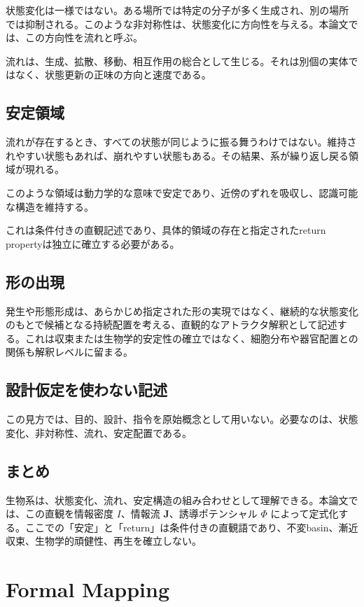 \documentclass[11pt]{ltjsarticle}
\newcommand{\I}{I}
\newcommand{\J}{\mathbf{J}}
\newcommand{\PhiI}{\Phi}
\begin{document}
状態変化は一様ではない。ある場所では特定の分子が多く生成され、別の場所では抑制される。このような非対称性は、状態変化に方向性を与える。本論文では、この方向性を流れと呼ぶ。

流れは、生成、拡散、移動、相互作用の総合として生じる。それは別個の実体ではなく、状態更新の正味の方向と速度である。

\subsection{安定領域}

流れが存在するとき、すべての状態が同じように振る舞うわけではない。維持されやすい状態もあれば、崩れやすい状態もある。その結果、系が繰り返し戻る領域が現れる。

このような領域は動力学的な意味で安定であり、近傍のずれを吸収し、認識可能な構造を維持する。

これは条件付きの直観記述であり、具体的領域の存在と指定されたreturn propertyは独立に確立する必要がある。

\subsection{形の出現}

発生や形態形成は、あらかじめ指定された形の実現ではなく、継続的な状態変化のもとで候補となる持続配置を考える、直観的なアトラクタ解釈として記述する。これは収束または生物学的安定性の確立ではなく、細胞分布や器官配置との関係も解釈レベルに留まる。

\subsection{設計仮定を使わない記述}

この見方では、目的、設計、指令を原始概念として用いない。必要なのは、状態変化、非対称性、流れ、安定配置である。

\subsection{まとめ}

生物系は、状態変化、流れ、安定構造の組み合わせとして理解できる。本論文では、この直観を情報密度 \(\I\)、情報流 \(\J\)、誘導ポテンシャル \(\PhiI\) によって定式化する。ここでの「安定」と「return」は条件付きの直観語であり、不変basin、漸近収束、生物学的頑健性、再生を確立しない。

\section{Formal Mapping}
\end{document}
